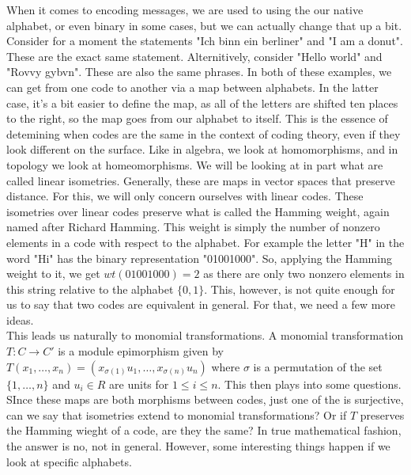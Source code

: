 When it comes to encoding messages, we are used to using the our native alphabet, or even binary in some
cases, but we can actually change that up a bit. Consider for a moment the statements "Ich binn ein
berliner" and "I am a donut". These are the exact same statement. Alternitively, consider "Hello world"
and "Rovvy gybvn". These are also the same phrases. In both of these examples, we can get from one code
to another via a map between alphabets. In the latter case, it's a bit easier to define the map, as all
of the letters are shifted ten places to the right, so the map goes from our alphabet to itself. This is
the essence of detemining when codes are the same in the context of coding theory, even if they look
different on the surface. Like in algebra, we look at homomorphisms, and in topology we look at
homeomorphisms. We will be looking at in part what are
called linear isometries. Generally, these are maps in vector spaces that preserve distance.
For this, we will only concern ourselves with linear codes. These isometries over linear codes
preserve what is called the Hamming weight, again named after Richard Hamming. This weight is simply the
number of nonzero elements in a code with respect to the alphabet. For example the letter "H" in the
word "Hi" has the binary representation "01001000". So, applying the Hamming weight to it, we get
$wt(01001000)=2$ as there are only two nonzero elements in this string relative to the alphabet
$\{0,1\}$. This, however, is not quite enough for us to say that two codes are equivalent in general.
For that, we need a few more ideas.\\

This leads us naturally to monomial transformations. A monomial transformation $T:C\to C'$ is a module
epimorphism given by $T(x_1,\ldots,x_n)=(x_{\sigma(1)}u_1,\ldots,x_{\sigma(n)}u_n)$ where $\sigma$ is a
permutation of the set $\{1,\ldots,n\}$ and $u_i\in R$ are units for $1\leq i\leq n$. This then plays 
into some questions.
SInce these maps are both morphisms between codes, just one of the is surjective, can we say that
isometries extend to monomial transformations? Or if $T$ preserves the Hamming wieght of a code, are
they the same? In true mathematical fashion, the answer is no, not in general. However, some interesting
things happen if we look at specific alphabets.\\

